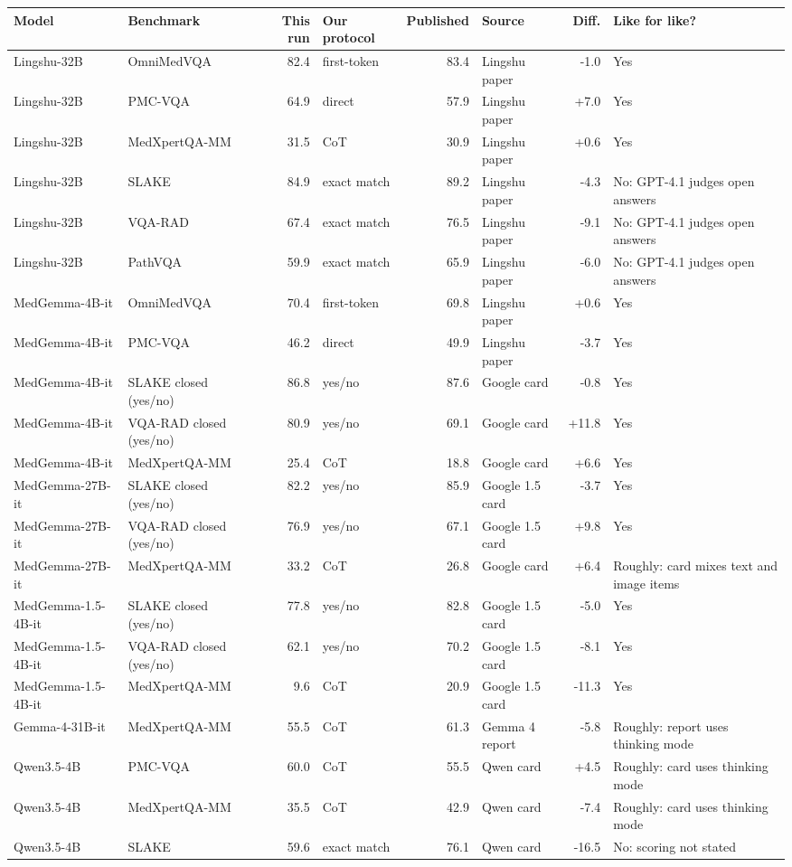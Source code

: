 \begin{tabular}{@{}llrlrlrl@{}}
\toprule
Model & Benchmark & This run & Our protocol & Published & Source & Diff. & Like for like? \\
\midrule
Lingshu-32B & OmniMedVQA & 82.4 & first-token & 83.4 & Lingshu paper & -1.0 & Yes \\
Lingshu-32B & PMC-VQA & 64.9 & direct & 57.9 & Lingshu paper & +7.0 & Yes \\
Lingshu-32B & MedXpertQA-MM & 31.5 & CoT & 30.9 & Lingshu paper & +0.6 & Yes \\
Lingshu-32B & SLAKE & 84.9 & exact match & 89.2 & Lingshu paper & -4.3 & No: GPT-4.1 judges open answers \\
Lingshu-32B & VQA-RAD & 67.4 & exact match & 76.5 & Lingshu paper & -9.1 & No: GPT-4.1 judges open answers \\
Lingshu-32B & PathVQA & 59.9 & exact match & 65.9 & Lingshu paper & -6.0 & No: GPT-4.1 judges open answers \\
MedGemma-4B-it & OmniMedVQA & 70.4 & first-token & 69.8 & Lingshu paper & +0.6 & Yes \\
MedGemma-4B-it & PMC-VQA & 46.2 & direct & 49.9 & Lingshu paper & -3.7 & Yes \\
MedGemma-4B-it & SLAKE closed (yes/no) & 86.8 & yes/no & 87.6 & Google card & -0.8 & Yes \\
MedGemma-4B-it & VQA-RAD closed (yes/no) & 80.9 & yes/no & 69.1 & Google card & +11.8 & Yes \\
MedGemma-4B-it & MedXpertQA-MM & 25.4 & CoT & 18.8 & Google card & +6.6 & Yes \\
MedGemma-27B-it & SLAKE closed (yes/no) & 82.2 & yes/no & 85.9 & Google 1.5 card & -3.7 & Yes \\
MedGemma-27B-it & VQA-RAD closed (yes/no) & 76.9 & yes/no & 67.1 & Google 1.5 card & +9.8 & Yes \\
MedGemma-27B-it & MedXpertQA-MM & 33.2 & CoT & 26.8 & Google card & +6.4 & Roughly: card mixes text and image items \\
MedGemma-1.5-4B-it & SLAKE closed (yes/no) & 77.8 & yes/no & 82.8 & Google 1.5 card & -5.0 & Yes \\
MedGemma-1.5-4B-it & VQA-RAD closed (yes/no) & 62.1 & yes/no & 70.2 & Google 1.5 card & -8.1 & Yes \\
MedGemma-1.5-4B-it & MedXpertQA-MM & 9.6 & CoT & 20.9 & Google 1.5 card & -11.3 & Yes \\
Gemma-4-31B-it & MedXpertQA-MM & 55.5 & CoT & 61.3 & Gemma 4 report & -5.8 & Roughly: report uses thinking mode \\
Qwen3.5-4B & PMC-VQA & 60.0 & CoT & 55.5 & Qwen card & +4.5 & Roughly: card uses thinking mode \\
Qwen3.5-4B & MedXpertQA-MM & 35.5 & CoT & 42.9 & Qwen card & -7.4 & Roughly: card uses thinking mode \\
Qwen3.5-4B & SLAKE & 59.6 & exact match & 76.1 & Qwen card & -16.5 & No: scoring not stated \\
\bottomrule
\end{tabular}

